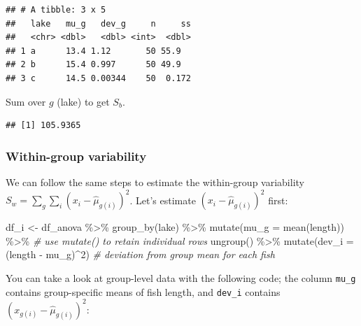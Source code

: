 \documentclass[
]{article}
\newenvironment{Shaded}{\begin{snugshade}}{\end{snugshade}}
\newcommand{\AttributeTok}[1]{\textcolor[rgb]{0.77,0.63,0.00}{#1}}
\newcommand{\CommentTok}[1]{\textcolor[rgb]{0.56,0.35,0.01}{\textit{#1}}}
\newcommand{\DecValTok}[1]{\textcolor[rgb]{0.00,0.00,0.81}{#1}}
\newcommand{\FunctionTok}[1]{\textcolor[rgb]{0.00,0.00,0.00}{#1}}
\newcommand{\NormalTok}[1]{#1}
\newcommand{\OtherTok}[1]{\textcolor[rgb]{0.56,0.35,0.01}{#1}}
\newcommand{\SpecialCharTok}[1]{\textcolor[rgb]{0.00,0.00,0.00}{#1}}
\begin{document}
\begin{verbatim}
## # A tibble: 3 x 5
##   lake   mu_g   dev_g     n     ss
##   <chr> <dbl>   <dbl> <int>  <dbl>
## 1 a      13.4 1.12       50 55.9  
## 2 b      15.4 0.997      50 49.9  
## 3 c      14.5 0.00344    50  0.172
\end{verbatim}

Sum over \(g\) (lake) to get \(S_b\).

\begin{Shaded}
\end{Shaded}

\begin{verbatim}
## [1] 105.9365
\end{verbatim}

\hypertarget{within-group-variability}{%
\subsubsection{Within-group variability}\label{within-group-variability}}

We can follow the same steps to estimate the within-group variability \(S_w = \sum_g \sum_i (x_{i} - \hat{\mu}_{g(i)})^2\). Let's estimate \((x_{i} - \hat{\mu}_{g(i)})^2\) first:

\begin{Shaded}
\begin{Highlighting}[]
\NormalTok{df\_i }\OtherTok{\textless{}{-}}\NormalTok{ df\_anova }\SpecialCharTok{\%\textgreater{}\%} 
  \FunctionTok{group\_by}\NormalTok{(lake) }\SpecialCharTok{\%\textgreater{}\%} 
  \FunctionTok{mutate}\NormalTok{(}\AttributeTok{mu\_g =} \FunctionTok{mean}\NormalTok{(length)) }\SpecialCharTok{\%\textgreater{}\%} \CommentTok{\# use mutate() to retain individual rows}
  \FunctionTok{ungroup}\NormalTok{() }\SpecialCharTok{\%\textgreater{}\%} 
  \FunctionTok{mutate}\NormalTok{(}\AttributeTok{dev\_i =}\NormalTok{ (length }\SpecialCharTok{{-}}\NormalTok{ mu\_g)}\SpecialCharTok{\^{}}\DecValTok{2}\NormalTok{) }\CommentTok{\# deviation from group mean for each fish}
\end{Highlighting}
\end{Shaded}

You can take a look at group-level data with the following code; the column \texttt{mu\_g} contains group-specific means of fish length, and \texttt{dev\_i} contains \((x_{g(i)} - \hat{\mu}_{g(i)})^2\):
\end{document}

